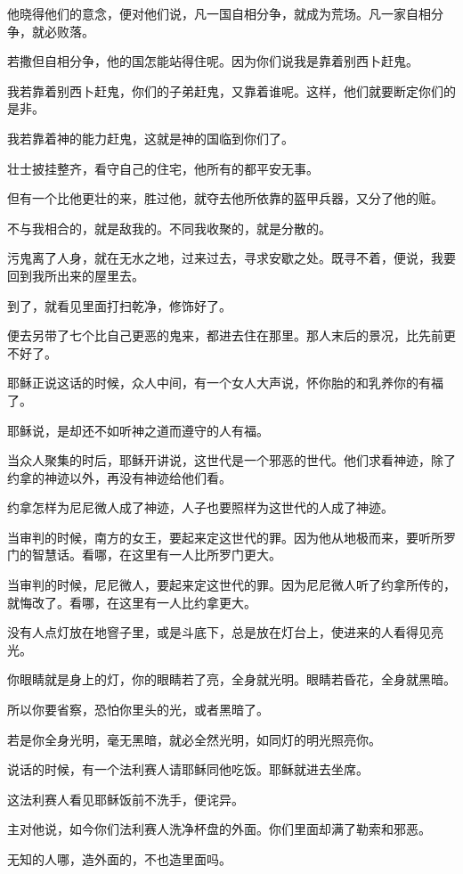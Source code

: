 \documentclass[12pt,oneside]{book}
\begin{document}
他晓得他们的意念，便对他们说，凡一国自相分争，就成为荒场。凡一家自相分争，就必败落。

若撒但自相分争，他的国怎能站得住呢。因为你们说我是靠着别西卜赶鬼。

我若靠着别西卜赶鬼，你们的子弟赶鬼，又靠着谁呢。这样，他们就要断定你们的是非。

我若靠着神的能力赶鬼，这就是神的国临到你们了。

壮士披挂整齐，看守自己的住宅，他所有的都平安无事。

但有一个比他更壮的来，胜过他，就夺去他所依靠的盔甲兵器，又分了他的赃。

不与我相合的，就是敌我的。不同我收聚的，就是分散的。

污鬼离了人身，就在无水之地，过来过去，寻求安歇之处。既寻不着，便说，我要回到我所出来的屋里去。

到了，就看见里面打扫乾净，修饰好了。

便去另带了七个比自己更恶的鬼来，都进去住在那里。那人末后的景况，比先前更不好了。

耶稣正说这话的时候，众人中间，有一个女人大声说，怀你胎的和乳养你的有福了。

耶稣说，是却还不如听神之道而遵守的人有福。

当众人聚集的时后，耶稣开讲说，这世代是一个邪恶的世代。他们求看神迹，除了约拿的神迹以外，再没有神迹给他们看。

约拿怎样为尼尼微人成了神迹，人子也要照样为这世代的人成了神迹。

当审判的时候，南方的女王，要起来定这世代的罪。因为他从地极而来，要听所罗门的智慧话。看哪，在这里有一人比所罗门更大。

当审判的时候，尼尼微人，要起来定这世代的罪。因为尼尼微人听了约拿所传的，就悔改了。看哪，在这里有一人比约拿更大。

没有人点灯放在地窨子里，或是斗底下，总是放在灯台上，使进来的人看得见亮光。

你眼睛就是身上的灯，你的眼睛若了亮，全身就光明。眼睛若昏花，全身就黑暗。

所以你要省察，恐怕你里头的光，或者黑暗了。

若是你全身光明，毫无黑暗，就必全然光明，如同灯的明光照亮你。

说话的时候，有一个法利赛人请耶稣同他吃饭。耶稣就进去坐席。

这法利赛人看见耶稣饭前不洗手，便诧异。

主对他说，如今你们法利赛人洗净杯盘的外面。你们里面却满了勒索和邪恶。

无知的人哪，造外面的，不也造里面吗。
\end{document}
